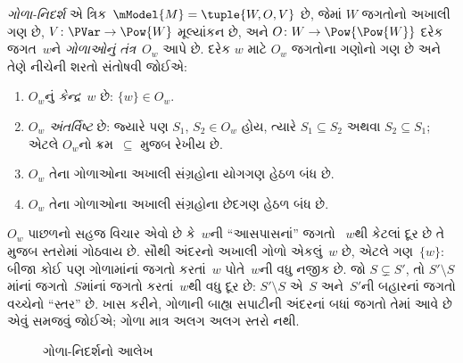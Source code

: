 \begin{defn}
  \emph{ગોળા-નિદર્શ} એ ત્રિક~$\mModel{M} = \tuple{W, O, V}$ છે,
  જેમાં $W$ જગતોનો અખાલી ગણ છે, $V\colon \PVar \to \Pow{W}$
  મૂલ્યાંકન છે, અને $O\colon W \to \Pow{\Pow{W}}$ દરેક જગત~$w$ને
  \emph{ગોળાઓનું તંત્ર}~$O_w$ આપે છે. દરેક $w$ માટે $O_w$ જગતોના
  ગણોનો ગણ છે અને તેણે નીચેની શરતો સંતોષવી જોઈએ:
  \begin{enumerate}
  \item $O_w$નું \emph{કેન્દ્ર}~$w$ છે: $\{w\} \in O_w$.
  \item $O_w$ \emph{અંતર્વિષ્ટ} છે: જ્યારે પણ $S_1$, $S_2 \in O_w$
    હોય, ત્યારે $S_1 \subseteq S_2$ અથવા $S_2 \subseteq S_1$;
    એટલે $O_w$નો ક્રમ~$\subseteq$ મુજબ રેખીય છે.
  \item $O_w$ તેના ગોળાઓના અખાલી સંગ્રહોના યોગગણ હેઠળ બંધ છે.
  \item $O_w$ તેના ગોળાઓના અખાલી સંગ્રહોના છેદગણ હેઠળ બંધ છે.
  \end{enumerate}
\end{defn}

$O_w$ પાછળનો સહજ વિચાર એવો છે કે~$w$ની ``આસપાસનાં'' જગતો
~$w$થી કેટલાં દૂર છે તે મુજબ સ્તરોમાં ગોઠવાય છે. સૌથી અંદરનો
અખાલી ગોળો એકલું~$w$ છે, એટલે ગણ~$\{w\}$: બીજા કોઈ પણ ગોળામાંનાં
જગતો કરતાં~$w$ પોતે~$w$ની વધુ નજીક છે. જો $S \subsetneq S'$, તો
$S' \setminus S$માંનાં જગતો~$S$માંનાં જગતો કરતાં~$w$થી વધુ દૂર
છે: $S' \setminus S$ એ~$S$ અને~$S'$ની બહારનાં જગતો વચ્ચેનો
``સ્તર'' છે. ખાસ કરીને, ગોળાની બાહ્ય સપાટીની અંદરનાં બધાં જગતો
તેમાં આવે છે એવું સમજવું જોઈએ; ગોળા માત્ર અલગ અલગ સ્તરો નથી.

\begin{figure}
\begin{center}
\caption{ગોળા-નિદર્શનો આલેખ}
\end{center}
\end{figure}

